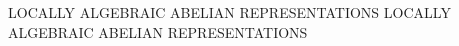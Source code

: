 %
  {LOCALLY ALGEBRAIC ABELIAN REPRESENTATIONS}%
  {LOCALLY ALGEBRAIC ABELIAN REPRESENTATIONS}





